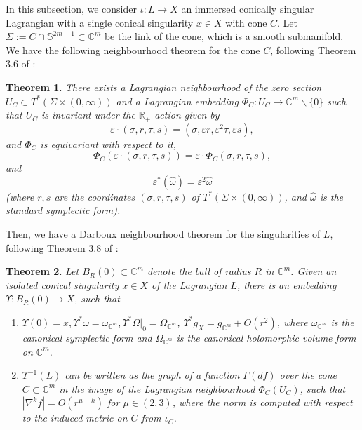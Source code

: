 \documentclass[10pt, a4paper]{article}
\theoremstyle{plain}%
\newtheorem{theorem}{Theorem}[section]
\theoremstyle{definition}
\numberwithin{figure}{section}
\numberwithin{equation}{section}
\newcommand{\bC}{\mathbb{C}}
\newcommand{\bS}{\mathbb{S}}
\newcommand{\rt}{\rightarrow}
\begin{document}
In this subsection, we consider $\iota:L\rt X$ an immersed conically singular Lagrangian with a single conical singularity $x\in X$ with cone $C$. Let $\Sigma := C \cap \bS^{2m-1} \subset \mathbb{C}^m$ be the link of the cone, which is a smooth submanifold. We have the following neighbourhood theorem for the cone $C$, following Theorem 3.6 of \cite{Joy04}:
\begin{theorem}\label{thm1}
	There exists a Lagrangian neighbourhood of the zero section $U_C\subset T^*(\Sigma \times (0,\infty)) $ and a Lagrangian embedding $\Phi_C : U_C \rightarrow \mathbb{C}^m\backslash \{0\}$ such that $U_C$ is invariant under the $\mathbb{R}_+$-action given by 
	\begin{equation}\label{eq_epsilonscalingcone}
		\varepsilon \cdot (\sigma,r,\tau,s) = (\sigma, \varepsilon r , \varepsilon^2 \tau, \varepsilon s),
	\end{equation}
	and $\Phi_C$ is equivariant with respect to it, 
	\begin{equation}\label{eq_epsilonscalingequivariance}
		\Phi_C(\varepsilon \cdot (\sigma, r, \tau, s)) = \varepsilon \cdot \Phi_C(\sigma,r,\tau,s), 
	\end{equation}
	and 
	\begin{equation}\label{eq_epsilonscalingsymplectic}
		\varepsilon^*(\hat{\omega}) = \varepsilon^2\hat{\omega}
	\end{equation}
	(where $r,s$ are the coordinates $(\sigma,r,\tau,s)$ of $T^*(\Sigma\times(0,\infty))$, and $\hat{\omega}$ is the standard symplectic form).
\end{theorem}

Then, we have a Darboux neighbourhood theorem for the singularities of $L$, following Theorem 3.8 of \cite{Joy04}:
\begin{theorem}\label{thm3}
	Let $B_R(0) \subset \mathbb{C}^m$ denote the ball of radius $R$ in $\mathbb{C}^m$. Given an isolated conical singularity $x\in X$ of the Lagrangian $L$, there is an embedding $\Upsilon : B_R(0)\rightarrow X$, such that 
	\begin{enumerate}
		\item $\Upsilon(0)=x, \Upsilon^*\omega = \omega_{\mathbb{C}^m}, \Upsilon^*\Omega|_0=\Omega_{\mathbb{C}^m}$, $\Upsilon^*g_X = g_{\mathbb{C}^m} + O(r^2)$, where $\omega_{\bC^m}$ is the canonical symplectic form and $\Omega_{\bC^m}$ is the canonical holomorphic volume form on $\bC^m$. 
		\item $\Upsilon^{-1}(L)$ can be written as the graph of a function $\Gamma(df)$ over the cone $C\subset \bC^m$ in the image of the Lagrangian neighbourhood $\Phi_C(U_C)$, such that $|\nabla^kf|= O(r^{\mu-k})$ for $\mu \in (2,3)$, where the norm is computed with respect to the induced metric on $C$ from $\iota_C$.
	\end{enumerate}
\end{theorem}
\end{document}
